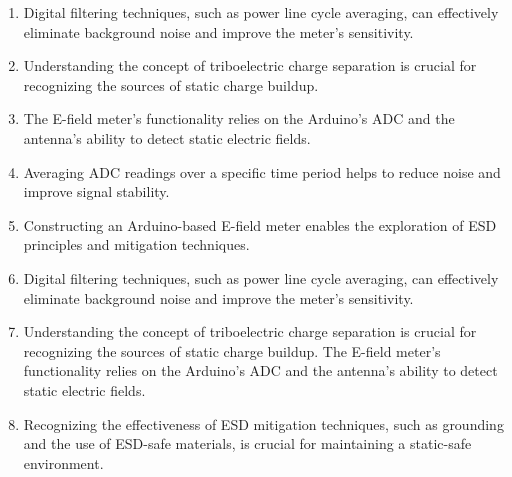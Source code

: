 \documentclass[a4paper,11pt]{article}%
\begin{document}
\begin{enumerate}
  \item  Digital filtering techniques, such as power line cycle averaging, can effectively eliminate background noise and improve the meter's sensitivity.

  \item Understanding the concept of triboelectric charge separation is crucial for recognizing the sources of static charge buildup.
  \item The E-field meter's functionality relies on the Arduino's ADC and the antenna's ability to detect static electric fields.

  \item Averaging ADC readings over a specific time period helps to reduce noise and improve signal stability.
  \item Constructing an Arduino-based E-field meter enables the exploration of ESD principles and mitigation techniques.
  \item Digital filtering techniques, such as power line cycle averaging, can effectively eliminate background noise and improve the meter's sensitivity.

  \item Understanding the concept of triboelectric charge separation is crucial for recognizing the sources of static charge buildup.
        The E-field meter's functionality relies on the Arduino's ADC and the antenna's ability to detect static electric fields.

  \item Recognizing the effectiveness of ESD mitigation techniques, such as grounding and the use of ESD-safe materials, is crucial for maintaining a static-safe environment.

\end{enumerate}
\end{document}

